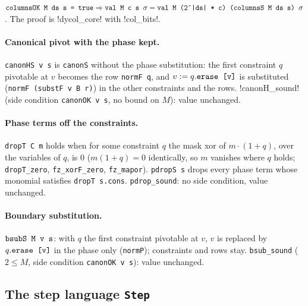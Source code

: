 \begin{theorem}
$\textnormal{\texttt{columnsOK M ds s = true}}\Rightarrow\textnormal{\texttt{val M c s \ensuremath{\sigma}}} = \textnormal{\texttt{val M (2\^{}|ds| * c) (columnsS M ds s) \ensuremath{\sigma}}}$.
The proof is \lean!dycol_core! with \lean!col_bits!.
\end{theorem}

\paragraph{Canonical pivot with the phase kept.} \textnormal{\texttt{canonHS v s}} is \textnormal{\texttt{canonS}} without the
phase substitution: the first constraint $q$ pivotable at $v$ becomes the row \textnormal{\texttt{normF q}}, and
$v:=q.\textnormal{\texttt{erase [v]}}$ is substituted (\textnormal{\texttt{normF (substF v B r)}}) in the other constraints and the
rows. \lean!canonH_sound! (side condition \textnormal{\texttt{canonOK v s}}, no bound on $M$): value unchanged.

\paragraph{Phase terms off the constraints.} \textnormal{\texttt{dropT C m}} holds when for some constraint $q$
the mask xor of $m\cdot(1+q)$, over the variables of $q$, is $0$ ($m(1+q)=0$ identically, so $m$
vanishes where $q$ holds; \textnormal{\texttt{dropT\_\allowbreak{}zero}}, \textnormal{\texttt{fz\_\allowbreak{}xorF\_\allowbreak{}zero}}, \textnormal{\texttt{fz\_\allowbreak{}mapor}}).
\textnormal{\texttt{pdropS s}} drops every phase term whose monomial satisfies \textnormal{\texttt{dropT s.\allowbreak{}cons}}.
\textnormal{\texttt{pdrop\_\allowbreak{}sound}}: no side condition, value unchanged.

\paragraph{Boundary substitution.} $\textnormal{\texttt{bsubS M v s}}$: with $q$ the first constraint pivotable at
$v$, $v$ is replaced by $q.\textnormal{\texttt{erase [v]}}$ in the phase only (\textnormal{\texttt{normP}}); constraints and rows
stay. \textnormal{\texttt{bsub\_\allowbreak{}sound}} ($2\le M$, side condition \textnormal{\texttt{canonOK v s}}): value unchanged.

\subsection{The step language \texorpdfstring{\textnormal{\texttt{Step}}}{Step}}

